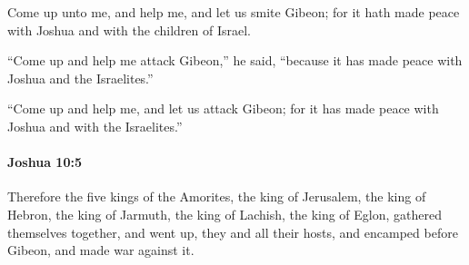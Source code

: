 			\begin{versebox}
					\item[BHS] 
					\item[ASV] Come up unto me, and help me, and let us smite Gibeon; for it hath made peace with Joshua and with the children of Israel.
					\item[NIV] “Come up and help me attack Gibeon,” he said, “because it has made peace with Joshua and the Israelites.”
					\item[NRSV] “Come up and help me, and let us attack Gibeon; for it has made peace with Joshua and with the Israelites.”
			\end{versebox}

		\paragraph{Joshua 10:5} %
			\label{JOSHUA-10-5}

			Therefore the five kings of the Amorites, the king of Jerusalem, the king of Hebron, the king of Jarmuth, the king of Lachish, the king of Eglon, gathered themselves together, and went up, they and all their hosts, and encamped before Gibeon, and made war against it.

